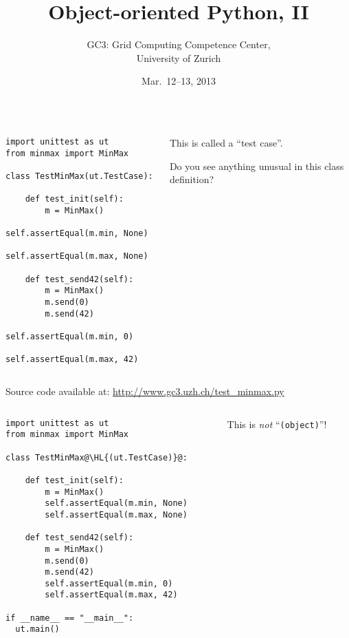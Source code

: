 \documentclass[english,serif,mathserif,xcolor=pdftex,dvipsnames,table]{beamer}
\title[OOP2]{%
  Object-oriented Python, II
}
\author[GC3]{%
  GC3: Grid Computing Competence Center, \\
  University of Zurich
}
\date{Mar.~12--13, 2013}
\begin{document}
\maketitle


\begin{frame}[fragile]
  \begin{columns}[t]
    \begin{column}{0.5\textwidth}
\begin{lstlisting}
import unittest as ut
from minmax import MinMax

class TestMinMax(ut.TestCase):

    def test_init(self):
        m = MinMax()
        self.assertEqual(m.min, None)
        self.assertEqual(m.max, None)

    def test_send42(self):
        m = MinMax()
        m.send(0)
        m.send(42)
        self.assertEqual(m.min, 0)
        self.assertEqual(m.max, 42)
\end{lstlisting}
    \end{column}
    \begin{column}{0.5\textwidth}
      \raggedleft
      This is called a ``test case''.

      \+
      Do you see anything unusual in this class definition?
    \end{column}
  \end{columns}

  {\small Source code available at:
    \url{http://www.gc3.uzh.ch/test_minmax.py}}
\end{frame}


\begin{frame}[fragile]
  \begin{columns}[t]
    \begin{column}{0.5\textwidth}
\begin{lstlisting}
import unittest as ut
from minmax import MinMax

class TestMinMax@\HL{(ut.TestCase)}@:

    def test_init(self):
        m = MinMax()
        self.assertEqual(m.min, None)
        self.assertEqual(m.max, None)

    def test_send42(self):
        m = MinMax()
        m.send(0)
        m.send(42)
        self.assertEqual(m.min, 0)
        self.assertEqual(m.max, 42)

if __name__ == "__main__":
  ut.main()
\end{lstlisting}
    \end{column}
    \begin{column}{0.5\textwidth}
      \raggedleft
      This is \emph{not} ``\texttt{(object)}''!
    \end{column}
  \end{columns}
\end{frame}
\end{document}
